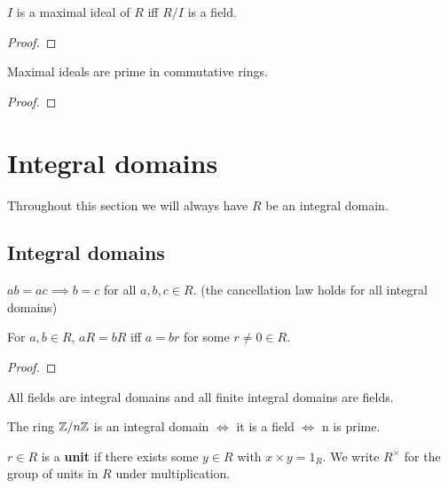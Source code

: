 \documentclass{report}
\begin{document}
\begin{theorem}
    $I$ is a maximal ideal of $R$ iff $R/I$ is a field.
    \begin{proof}
        
    \end{proof}
\end{theorem}

\begin{corollary}
    Maximal ideals are prime in commutative rings. \begin{proof}
        
    \end{proof}
\end{corollary}

\section{Integral domains}
Throughout this section we will always have $R$ be an integral domain.

\subsection{Integral domains}

\begin{theorem}
    $ab=ac\implies b=c$ for all $a,b,c\in R$. (the cancellation law holds for all integral domains)
\end{theorem}

\begin{proposition}
    For $a,b\in R$, $aR=bR$ iff $a=br$ for some $r\neq 0 \in R$.
    \begin{proof}
        
    \end{proof}
\end{proposition}

\begin{theorem}
    All fields are integral domains and all finite integral domains are fields.
\end{theorem}

\begin{remark}
    The ring $\mathbb{Z}/n\mathbb{Z}$ is an integral domain $\iff$ it is a field $\iff$ n is prime.
\end{remark}

\begin{definition}[Unit]
    $r\in R$ is a \textbf{unit} if there exists some $y\in R$ with $x\times y=1_R$. We write  $R^\times$ for the group of units in $R$ under multiplication.
\end{definition}
\end{document}
